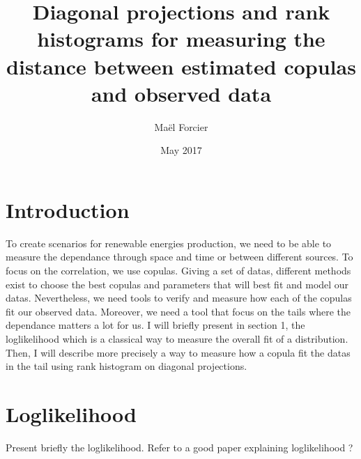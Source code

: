 \documentclass{article}
\title{Diagonal projections and rank histograms for measuring the distance between estimated copulas and observed data}
\author{Ma\"{e}l Forcier}
\date{May 2017}
\begin{document}
   \maketitle
   \section{Introduction}
  	To create scenarios for renewable energies production, we need to be able to measure the dependance through space and time or between different sources. To focus on the correlation, we use copulas. Giving a set of datas, different methods exist to choose the best copulas and parameters that will best fit and model our datas. Nevertheless, we need tools to verify and measure how each of the copulas fit our observed data. Moreover, we need a tool that focus on the tails where the dependance matters a lot for us. I will briefly present in section 1, the loglikelihood which is a classical way to measure the overall fit of a distribution. Then, I will describe more precisely a way to measure how a copula fit the datas in the tail using rank histogram on diagonal projections.
  	
   \section{Loglikelihood}
   Present briefly the loglikelihood. Refer to a good paper explaining loglikelihood ?
   
   
\end{document}
